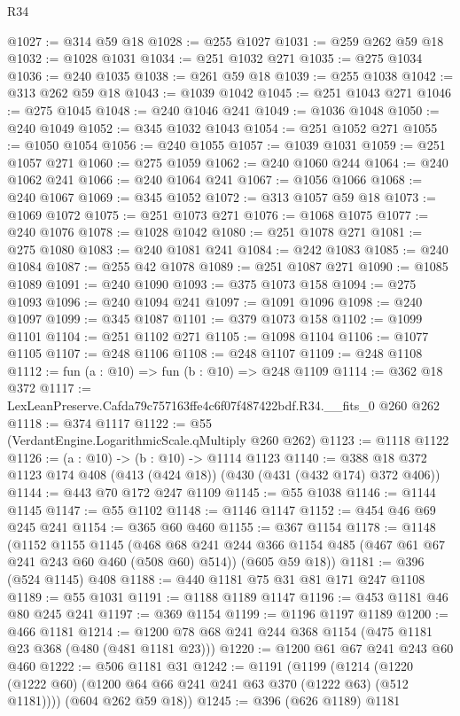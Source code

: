 \begin{lexlean}{R34}
\begin{coremodule}
@1027 := @314 @59 @18
@1028 := @255 @1027
@1031 := @259 @262 @59 @18
@1032 := @1028 @1031
@1034 := @251 @1032 @271
@1035 := @275 @1034
@1036 := @240 @1035
@1038 := @261 @59 @18
@1039 := @255 @1038
@1042 := @313 @262 @59 @18
@1043 := @1039 @1042
@1045 := @251 @1043 @271
@1046 := @275 @1045
@1048 := @240 @1046 @241
@1049 := @1036 @1048
@1050 := @240 @1049
@1052 := @345 @1032 @1043
@1054 := @251 @1052 @271
@1055 := @1050 @1054
@1056 := @240 @1055
@1057 := @1039 @1031
@1059 := @251 @1057 @271
@1060 := @275 @1059
@1062 := @240 @1060 @244
@1064 := @240 @1062 @241
@1066 := @240 @1064 @241
@1067 := @1056 @1066
@1068 := @240 @1067
@1069 := @345 @1052
@1072 := @313 @1057 @59 @18
@1073 := @1069 @1072
@1075 := @251 @1073 @271
@1076 := @1068 @1075
@1077 := @240 @1076
@1078 := @1028 @1042
@1080 := @251 @1078 @271
@1081 := @275 @1080
@1083 := @240 @1081 @241
@1084 := @242 @1083
@1085 := @240 @1084
@1087 := @255 @42 @1078
@1089 := @251 @1087 @271
@1090 := @1085 @1089
@1091 := @240 @1090
@1093 := @375 @1073 @158
@1094 := @275 @1093
@1096 := @240 @1094 @241
@1097 := @1091 @1096
@1098 := @240 @1097
@1099 := @345 @1087
@1101 := @379 @1073 @158
@1102 := @1099 @1101
@1104 := @251 @1102 @271
@1105 := @1098 @1104
@1106 := @1077 @1105
@1107 := @248 @1106
@1108 := @248 @1107
@1109 := @248 @1108
@1112 := fun (a : @10) => fun (b : @10) => @248 @1109
@1114 := @362 @18 @372
@1117 := LexLeanPreserve.Cafda79c757163ffe4c6f07f487422bdf.R34.__fits_0 @260 @262
@1118 := @374 @1117
@1122 := @55 (VerdantEngine.LogarithmicScale.qMultiply @260 @262)
@1123 := @1118 @1122
@1126 := (a : @10) -> (b : @10) -> @1114 @1123
@1140 := @388 @18 @372 @1123 @174 @408 (@413 (@424 @18)) (@430 (@431 (@432 @174) @372 @406))
@1144 := @443 @70 @172 @247 @1109
@1145 := @55 @1038
@1146 := @1144 @1145
@1147 := @55 @1102
@1148 := @1146 @1147
@1152 := @454 @46 @69 @245 @241
@1154 := @365 @60 @460
@1155 := @367 @1154
@1178 := @1148
    (@1152
      @1155
      @1145
      (@468 @68 @241 @244 @366 @1154 @485 (@467 @61 @67 @241 @243 @60 @460 (@508 @60) @514))
      (@605 @59 @18))
@1181 := @396 (@524 @1145) @408
@1188 := @440 @1181 @75 @31 @81 @171 @247 @1108
@1189 := @55 @1031
@1191 := @1188 @1189 @1147
@1196 := @453 @1181 @46 @80 @245 @241
@1197 := @369 @1154
@1199 := @1196 @1197 @1189
@1200 := @466 @1181
@1214 := @1200 @78 @68 @241 @244 @368 @1154 (@475 @1181 @23 @368 (@480 (@481 @1181 @23)))
@1220 := @1200 @61 @67 @241 @243 @60 @460
@1222 := @506 @1181 @31
@1242 := @1191
    (@1199
      (@1214 (@1220 (@1222 @60) (@1200 @64 @66 @241 @241 @63 @370 (@1222 @63) (@512 @1181))))
      (@604 @262 @59 @18))
@1245 := @396 (@626 @1189) @1181

\end{coremodule}
\end{lexlean}
